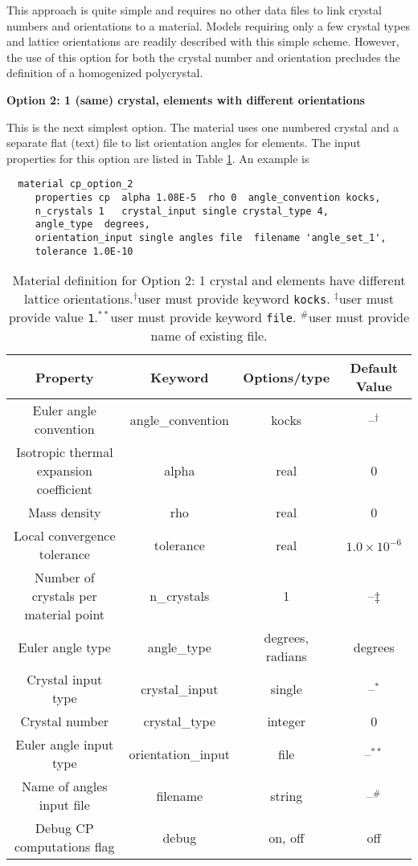 \documentclass[11pt]{report}
\numberwithin{equation}{section}
\newcommand{\ttt} {\texttt}  %
\newcommand{\noi}{\noindent}
\begin{document}
This approach is quite simple and requires no other data files to link crystal numbers
and orientations to a material. Models requiring only a few crystal types and
lattice orientations are readily described with this simple scheme. 
However, the use of this option for both the crystal number and orientation precludes 
the definition of a homogenized polycrystal.  

\noi \textbf {Option 2: 1 (same) crystal, elements with different orientations} 

\noi This is the next simplest option. The material uses one numbered crystal and
a separate flat (text) file to list orientation angles for elements.
The input properties for this option are listed
in Table \ref{tab:mat-props-option2}.  An example is

\small
\begin{verbatim}
  material cp_option_2
     properties cp  alpha 1.08E-5  rho 0  angle_convention kocks,
     n_crystals 1   crystal_input single crystal_type 4,
     angle_type  degrees,
     orientation_input single angles file  filename 'angle_set_1',
     tolerance 1.0E-10
\end{verbatim}
\normalsize


\begin{table}[htb]
\small
\centering
\setlength{\extrarowheight}{3pt}
\begin{tabular}{|c|c|c|c|}
\hline 
Property & Keyword & Options/type&Default Value\tabularnewline
\hline \hline
Euler angle convention & angle\_convention & kocks& --$^\dag$\tabularnewline \hline
Isotropic thermal expansion coefficient & alpha & real&0\tabularnewline \hline
Mass density & rho & real&0\tabularnewline \hline
Local convergence tolerance & tolerance & real&$1.0\times 10^{-6}$\tabularnewline \hline
Number of crystals per material point & n\_crystals & 1&--$\ddag$\tabularnewline \hline
Euler angle type & angle\_type & degrees, radians&degrees\tabularnewline \hline
Crystal input type & crystal\_input & single&--$^*$\tabularnewline \hline
Crystal number  & crystal\_type & integer&0\tabularnewline \hline
Euler angle input type & orientation\_input &  file&--$^{**}$\tabularnewline \hline
Name of angles input file  & filename & string&--$^\#$\tabularnewline\hline
Debug CP computations flag & debug & on, off&off\tabularnewline
\hline 
\end{tabular}
\caption{Material definition for Option 2: 1 crystal and elements have different
lattice orientations.$^\dag$user must provide keyword \ttt{kocks}.
$^\ddag$user must provide value \ttt{1}.$^{**}$user must provide keyword \ttt{file}. 
$^\#$user must provide name of existing file. 
\label{tab:mat-props-option2}}
\normalsize
\end{table}
\end{document}
